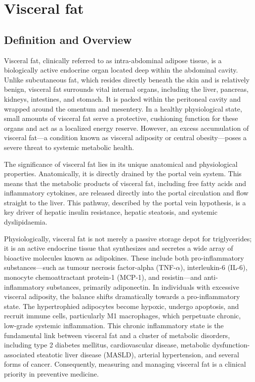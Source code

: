 \chapter{Visceral fat}

\section*{Definition and Overview}
Visceral fat, clinically referred to as intra-abdominal adipose tissue, is a biologically active endocrine organ located deep within the abdominal cavity. Unlike subcutaneous fat, which resides directly beneath the skin and is relatively benign, visceral fat surrounds vital internal organs, including the liver, pancreas, kidneys, intestines, and stomach. It is packed within the peritoneal cavity and wrapped around the omentum and mesentery. In a healthy physiological state, small amounts of visceral fat serve a protective, cushioning function for these organs and act as a localized energy reserve. However, an excess accumulation of visceral fat—a condition known as visceral adiposity or central obesity—poses a severe threat to systemic metabolic health.

The significance of visceral fat lies in its unique anatomical and physiological properties. Anatomically, it is directly drained by the portal vein system. This means that the metabolic products of visceral fat, including free fatty acids and inflammatory cytokines, are released directly into the portal circulation and flow straight to the liver. This pathway, described by the portal vein hypothesis, is a key driver of hepatic insulin resistance, hepatic steatosis, and systemic dyslipidaemia.

Physiologically, visceral fat is not merely a passive storage depot for triglycerides; it is an active endocrine tissue that synthesizes and secretes a wide array of bioactive molecules known as adipokines. These include both pro-inflammatory substances—such as tumour necrosis factor-alpha (TNF-$\alpha$), interleukin-6 (IL-6), monocyte chemoattractant protein-1 (MCP-1), and resistin—and anti-inflammatory substances, primarily adiponectin. In individuals with excessive visceral adiposity, the balance shifts dramatically towards a pro-inflammatory state. The hypertrophied adipocytes become hypoxic, undergo apoptosis, and recruit immune cells, particularly M1 macrophages, which perpetuate chronic, low-grade systemic inflammation. This chronic inflammatory state is the fundamental link between visceral fat and a cluster of metabolic disorders, including type 2 diabetes mellitus, cardiovascular disease, metabolic dysfunction-associated steatotic liver disease (MASLD), arterial hypertension, and several forms of cancer. Consequently, measuring and managing visceral fat is a clinical priority in preventive medicine.

